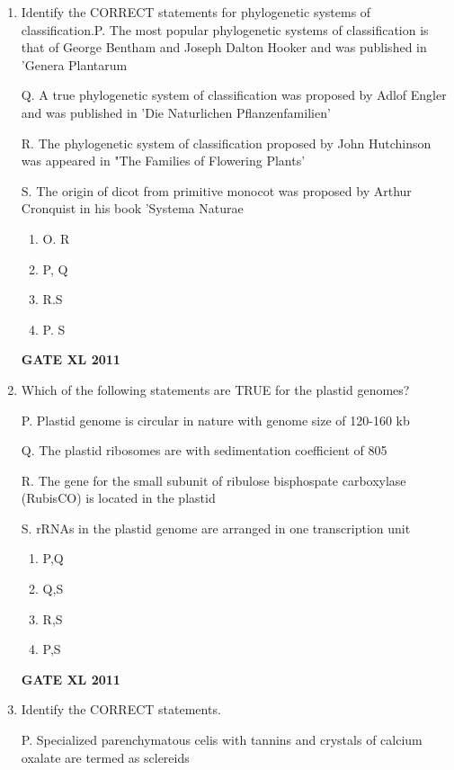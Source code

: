 \documentclass[journal,12pt,onecolumn]{IEEEtran}
\begin{document}
\begin{enumerate}
\item {Identify the CORRECT statements for phylogenetic systems of classification.\newline P. The most popular phylogenetic systems of classification is that of George Bentham and Joseph Dalton Hooker and was published in 'Genera Plantarum

Q. A true phylogenetic system of classification was proposed by Adlof Engler and was published in 'Die Naturlichen Pflanzenfamilien'

R. The phylogenetic system of classification proposed by John Hutchinson was appeared in "The Families of Flowering Plants'

S. The origin of dicot from primitive monocot was proposed by Arthur Cronquist in his book 'Systema Naturae}

		\begin{enumerate}
			\item O. R
			\item P, Q
			\item R.S
			\item P. S
		\end{enumerate}
		\hfill{\textbf{GATE XL 2011}}

\item{ Which of the following statements are TRUE for the plastid genomes?

P. Plastid genome is circular in nature with genome size of 120-160 kb

Q. The plastid ribosomes are with sedimentation coefficient of 805

R. The gene for the small subunit of ribulose bisphospate carboxylase (RubisCO) is located in the plastid

S. rRNAs in the plastid genome are arranged in one transcription unit}
\begin{multicols}{4}
		\begin{enumerate}
			\item P,Q
			\item Q,S
			\item R,S
			\item P,S
		\end{enumerate}
\end{multicols}
		\hfill{\textbf{GATE XL 2011}}

\item {Identify the CORRECT statements.


P. Specialized parenchymatous celis with tannins and crystals of calcium oxalate are termed as sclereids

}
\end{enumerate}
\end{document}
